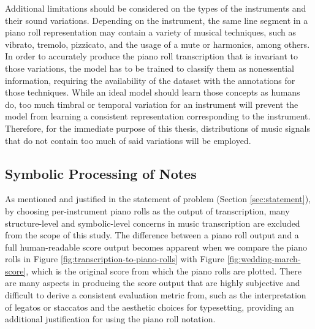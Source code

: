 Additional limitations should be considered on the types of the instruments and their sound variations.
Depending on the instrument, the same line segment in a piano roll representation may contain a variety of musical techniques, such as vibrato, tremolo, pizzicato, and the usage of a mute or harmonics, among others.
In order to accurately produce the piano roll transcription that is invariant to those variations, the model has to be trained to classify them as nonessential information, requiring the availability of the dataset with the annotations for those techniques.
While an ideal model should learn those concepts as humans do, too much timbral or temporal variation for an instrument will prevent the model from learning a consistent representation corresponding to the instrument.
Therefore, for the immediate purpose of this thesis, distributions of music signals that do not contain too much of said variations will be employed.


\subsection{Symbolic Processing of Notes}

As mentioned and justified in the statement of problem (Section \ref{sec:statement}), by choosing per-instrument piano rolls as the output of transcription, many structure-level and symbolic-level concerns in music transcription are excluded from the scope of this study.
The difference between a piano roll output and a full human-readable score output becomes apparent when we compare the piano rolls in Figure \ref{fig:transcription-to-piano-rolls} with Figure \ref{fig:wedding-march-score}, which is the original score from which the piano rolls are plotted.
There are many aspects in producing the score output that are highly subjective and difficult to derive a consistent evaluation metric from, such as the interpretation of legatos or staccatos and the aesthetic choices for typesetting, providing an additional justification for using the piano roll notation.



